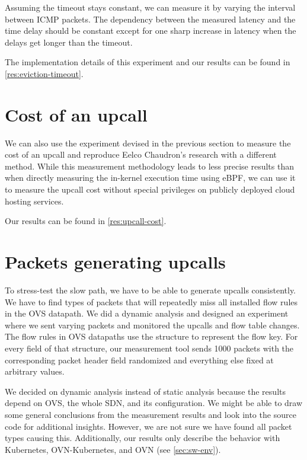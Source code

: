 Assuming the timeout stays constant, we can measure it by varying the interval between ICMP packets. The dependency between the measured latency and the time delay should be constant except for one sharp increase in latency when the delays get longer than the timeout.

The implementation details of this experiment and our results can be found in \cref{res:eviction-timeout}.

\section{Cost of an upcall}
\label{design:upcall-cost}

We can also use the experiment devised in the previous section to measure the cost of an upcall and reproduce Eelco Chaudron's research with a different method. While this measurement methodology leads to less precise results than when directly measuring the in-kernel execution time using eBPF, we can use it to measure the upcall cost without special privileges on publicly deployed cloud hosting services.

Our results can be found in \cref{res:upcall-cost}.

\section{Packets generating upcalls}
\label{design:upcall-generators}

To stress-test the slow path, we have to be able to generate upcalls consistently. We have to find types of packets that will repeatedly miss all installed flow rules in the OVS datapath. We did a dynamic analysis and designed an experiment where we sent varying packets and monitored the upcalls and flow table changes. The flow rules in OVS datapaths use the  structure to represent the flow key. For every field of that structure, our measurement tool sends 1000 packets with the corresponding packet header field randomized and everything else fixed at arbitrary values.

We decided on dynamic analysis instead of static analysis because the results depend on OVS, the whole SDN, and its configuration. We might be able to draw some general conclusions from the measurement results and look into the source code for additional insights. However, we are not sure we have found all packet types causing this. Additionally, our results only describe the behavior with Kubernetes, OVN-Kubernetes, and OVN (see \cref{sec:sw-env}).

